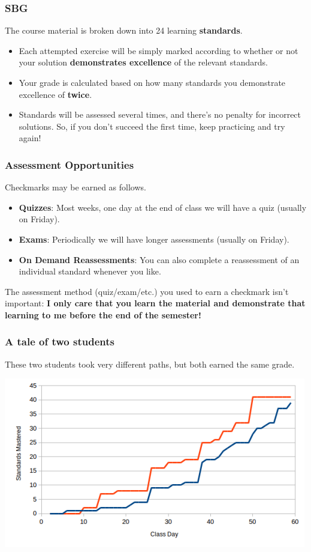 \documentclass[aspectration=1610]{beamer}
\begin{document}
\begin{frame}\frametitle{SBG}
The course material is broken down into 24 learning \textbf{standards}.
\begin{itemize}
\item Each attempted exercise will be simply marked according to whether or not
      your solution \textbf{demonstrates excellence} of the relevant standards.
\item Your grade is calculated based on how many standards you demonstrate excellence of \textbf{twice}.
\item Standards will be assessed several times, and there's no penalty for
      incorrect solutions. So, if you don't succeed the first time,
      keep practicing and try again!
\end{itemize}
\end{frame}

\begin{frame}\frametitle{Assessment Opportunities}
Checkmarks may be earned as follows.
\begin{itemize}
\item {\bf Quizzes}: Most weeks, one day at the end of class we will have a quiz (usually on Friday). 
\item {\bf Exams}: Periodically we will have longer assessments (usually on Friday).
\item {\bf On Demand Reassessments}: You can also complete a reassessment of an individual standard whenever you like.
\end{itemize}

\pause

\vspace{0.2in}

The assessment method (quiz/exam/etc.) you used to earn a checkmark
isn't important: \textbf{I only care that you
learn the material and demonstrate that learning to me before the end of the
semester!}
\end{frame}

\begin{frame}\frametitle{A tale of two students}
These two students took very different paths, but both earned the same grade.
\begin{center}
\includegraphics[scale=0.7]{student-comparison.png}
\end{center}
\end{frame}
\end{document}
